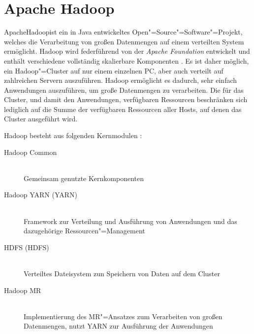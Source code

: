 \section{Apache Hadoop}
\label{sec:hadoop}

Apache\texttrademark Hadoop\textregistered ist ein in Java entwickeltes Open"=Source"=Software"=Projekt, welches die Verarbeitung von großen Datenmengen auf einem verteilten System ermöglicht.
Hadoop wird federführend von der \emph{Apache Foundation} entwickelt und enthält verschiedene vollständig skalierbare Komponenten \cite{HadoopHomePage}.
Es ist daher möglich, ein Hadoop"=Cluster auf nur einem einzelnen PC, aber auch verteilt auf zahlreichen Servern auszuführen.
Hadoop ermöglicht es dadurch, sehr einfach Anwendungen auszuführen, um große Datenmengen zu verarbeiten.
Die für das Cluster, und damit den Anwendungen, verfügbaren Ressourcen beschränken sich lediglich auf die Summe der verfügbaren Ressourcen aller Hosts, auf denen das Cluster ausgeführt wird.

Hadoop besteht aus folgenden Kernmodulen \cite{HadoopHomePage}:

\begin{description}
	\item[Hadoop Common] \hfill \\
        Gemeinsam genutzte Kernkomponenten
	\item[Hadoop \acrshort{YARN} (\acrlong{YARN})] \hfill \\
        Framework zur Verteilung und Ausführung von Anwendungen und das dazugehörige Ressourcen"=Management
	\item[\acrlong{HDFS} (\acrshort{HDFS})] \hfill \\
        Verteiltes Dateisystem zun Speichern von Daten auf dem Cluster
	\item[Hadoop \gls{MR}] \hfill \\
        Implementierung des \gls{MR}"=Ansatzes zum Verarbeiten von großen Datenmengen, nutzt YARN zur Ausführung der Anwendungen
\end{description}

